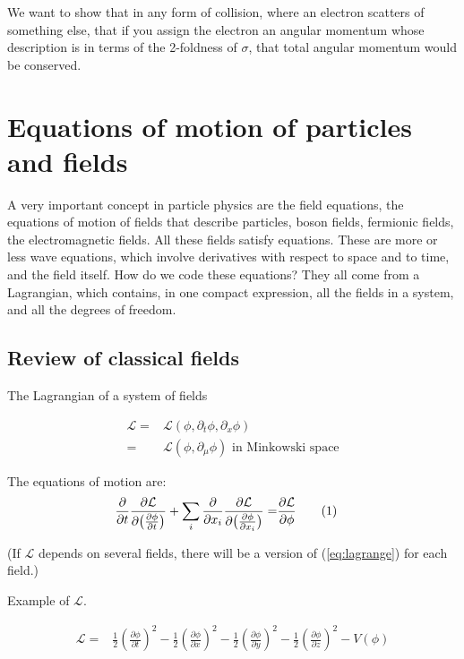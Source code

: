 \documentclass[]{article}
\newcommand\numberthis{\addtocounter{equation}{1}\tag{\theequation}}
\begin{document}
We want to show that in any form of collision, where an electron scatters of something else, that if you assign the electron an angular momentum whose description is in terms of the 2-foldness of $\sigma$, that total angular momentum would be conserved.

\section{Equations of motion of particles and fields}\label{sect:equation:motion}

A very important concept in particle physics are the field equations, the equations of motion of fields that describe particles, boson fields, fermionic fields, the electromagnetic fields. All these fields satisfy equations. These are more or less wave equations, which involve derivatives with respect to space and to time, and the field itself. How do we code these equations? They all come from a Lagrangian, which contains, in one compact expression, all the fields in a system, and all the degrees of freedom.

\subsection{Review of classical fields}

The Lagrangian of a system of fields

\begin{align*}
	\mathcal{L}=& \mathcal{L}(\phi,\partial_t \phi, \partial_x \phi)\\
	=&\mathcal{L}(\phi,\partial_{\mu} \phi) \text{ in Minkowski space}
\end{align*}

The equations of motion are:
\begin{align*}
	\frac{\partial}{\partial t} \frac{\partial \mathcal{L}}{\partial \big(\frac{\partial \phi}{\partial t}\big)}+\sum_i \frac{\partial}{\partial x_i} \frac{\partial \mathcal{L}}{\partial \big(\frac{\partial \phi}{\partial x_i}\big)}=&\frac{\partial \mathcal{L}}{\partial \phi} \numberthis \label{eq:lagrange}
\end{align*}

(If $\mathcal{L}$ depends on several fields, there will be a version of (\ref{eq:lagrange})  for each field.)

Example of $\mathcal{L}$.

\begin{align*}
	\mathcal{L} =& \frac{1}{2} (\frac{\partial \phi}{\partial t})^2 - \frac{1}{2} (\frac{\partial \phi}{\partial x})^2 - \frac{1}{2} (\frac{\partial \phi}{\partial y})^2 - \frac{1}{2} (\frac{\partial \phi}{\partial z})^2 - V(\phi)
\end{align*}
\end{document}
